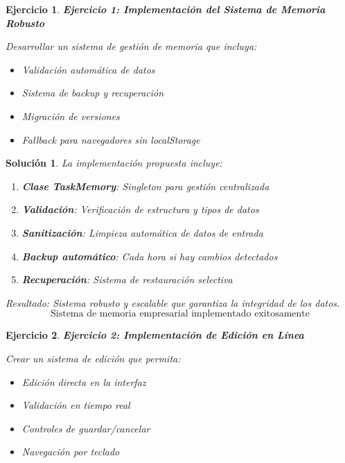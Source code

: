 \documentclass[12pt,a4paper]{article}
\newtheorem{exercise}{Ejercicio}
\newtheorem{solution}{Solución}
\begin{document}
\newpage

\begin{exercise}
\textbf{Ejercicio 1: Implementación del Sistema de Memoria Robusto}

Desarrollar un sistema de gestión de memoria que incluya:
\begin{itemize}
  \item Validación automática de datos
  \item Sistema de backup y recuperación
  \item Migración de versiones
  \item Fallback para navegadores sin localStorage
\end{itemize}
\end{exercise}

\begin{solution}
La implementación propuesta incluye:

\begin{enumerate}
  \item \textbf{Clase TaskMemory}: Singleton para gestión centralizada
  \item \textbf{Validación}: Verificación de estructura y tipos de datos
  \item \textbf{Sanitización}: Limpieza automática de datos de entrada
  \item \textbf{Backup automático}: Cada hora si hay cambios detectados
  \item \textbf{Recuperación}: Sistema de restauración selectiva
\end{enumerate}

Resultado: Sistema robusto y escalable que garantiza la integridad de los datos.
\[
\boxed{\text{Sistema de memoria empresarial implementado exitosamente}}
\]
\end{solution}

\begin{exercise}
\textbf{Ejercicio 2: Implementación de Edición en Línea}

Crear un sistema de edición que permita:
\begin{itemize}
  \item Edición directa en la interfaz
  \item Validación en tiempo real
  \item Controles de guardar/cancelar
  \item Navegación por teclado
\end{itemize}
\end{exercise}
\end{document}
